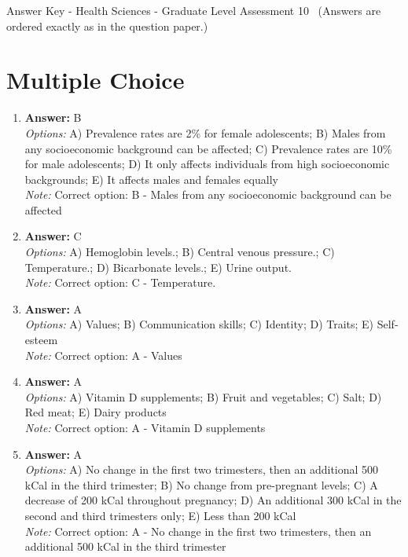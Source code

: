 \documentclass[12pt]{article}
\begin{document}
\begin{center}
Answer Key - Health Sciences - Graduate Level Assessment 10 \
\small (Answers are ordered exactly as in the question paper.)
\end{center}

\section*{Multiple Choice}
\begin{enumerate}[label=\arabic*.]
\item \textbf{Answer:} B
\\ \textit{Options:} A) Prevalence rates are 2\% for female adolescents; B) Males from any socioeconomic background can be affected; C) Prevalence rates are 10\% for male adolescents; D) It only affects individuals from high socioeconomic backgrounds; E) It affects males and females equally
\\ \textit{Note:} Correct option: B - Males from any socioeconomic background can be affected
\item \textbf{Answer:} C
\\ \textit{Options:} A) Hemoglobin levels.; B) Central venous pressure.; C) Temperature.; D) Bicarbonate levels.; E) Urine output.
\\ \textit{Note:} Correct option: C - Temperature.
\item \textbf{Answer:} A
\\ \textit{Options:} A) Values; B) Communication skills; C) Identity; D) Traits; E) Self-esteem
\\ \textit{Note:} Correct option: A - Values
\item \textbf{Answer:} A
\\ \textit{Options:} A) Vitamin D supplements; B) Fruit and vegetables; C) Salt; D) Red meat; E) Dairy products
\\ \textit{Note:} Correct option: A - Vitamin D supplements
\item \textbf{Answer:} A
\\ \textit{Options:} A) No change in the first two trimesters, then an additional 500 kCal in the third trimester; B) No change from pre-pregnant levels; C) A decrease of 200 kCal throughout pregnancy; D) An additional 300 kCal in the second and third trimesters only; E) Less than 200 kCal
\\ \textit{Note:} Correct option: A - No change in the first two trimesters, then an additional 500 kCal in the third trimester
\end{enumerate}
\end{document}
